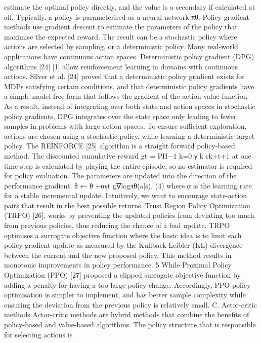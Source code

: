 estimate the optimal policy directly, and the value is a secondary if calculated at all. Typically, a policy is parameterised
as a neural network πθ. Policy gradient methods use gradient
descent to estimate the parameters of the policy that maximise
the expected reward. The result can be a stochastic policy
where actions are selected by sampling, or a deterministic
policy. Many real-world applications have continuous action
spaces. Deterministic policy gradient (DPG) algorithms [24]
[1] allow reinforcement learning in domains with continuous
actions. Silver et al. [24] proved that a deterministic policy
gradient exists for MDPs satisfying certain conditions, and
that deterministic policy gradients have a simple model-free
form that follows the gradient of the action-value function.
As a result, instead of integrating over both state and action
spaces in stochastic policy gradients, DPG integrates over
the state space only leading to fewer samples in problems
with large action spaces. To ensure sufficient exploration,
actions are chosen using a stochastic policy, while learning a
deterministic target policy. The REINFORCE [25] algorithm
is a straight forward policy-based method. The discounted
cumulative reward gt =
PH−1
k=0
γ
k
rk+t+1 at one time step is
calculated by playing the entire episode, so no estimator is
required for policy evaluation. The parameters are updated into
the direction of the performance gradient:
θ ← θ +αγt
g∇logπθ(a|s), (4)
where α is the learning rate for a stable incremental update.
Intuitively, we want to encourage state-action pairs that result
in the best possible returns. Trust Region Policy Optimization
(TRPO) [26], works by preventing the updated policies from
deviating too much from previous policies, thus reducing the
chance of a bad update. TRPO optimises a surrogate objective
function where the basic idea is to limit each policy gradient
update as measured by the Kullback-Leibler (KL) divergence
between the current and the new proposed policy. This method
results in monotonic improvements in policy performance.
5
While Proximal Policy Optimization (PPO) [27] proposed a
clipped surrogate objective function by adding a penalty for
having a too large policy change. Accordingly, PPO policy
optimisation is simpler to implement, and has better sample
complexity while ensuring the deviation from the previous
policy is relatively small.
C. Actor-critic methods
Actor-critic methods are hybrid methods that combine the
benefits of policy-based and value-based algorithms. The
policy structure that is responsible for selecting actions is
